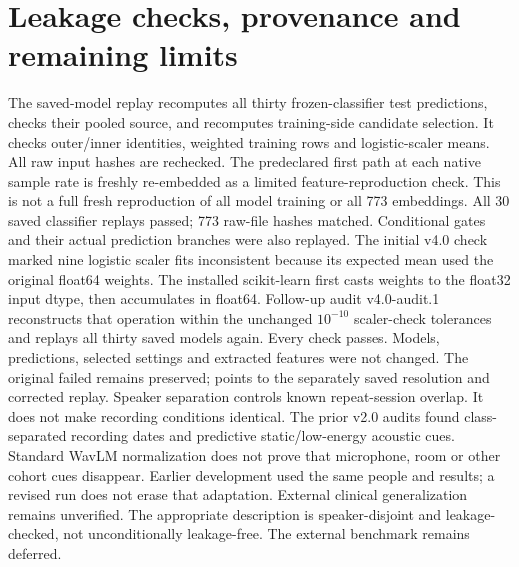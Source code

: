 \documentclass[11pt,a4paper]{article}
\begin{document}
\clearpage\section{Leakage checks, provenance and remaining limits}
The saved-model replay recomputes all thirty frozen-classifier test predictions,
checks their pooled source, and recomputes training-side candidate selection.
It checks outer/inner identities, weighted training rows and logistic-scaler means.
All raw input hashes are rechecked. The predeclared first path at each native
sample rate is freshly re-embedded as a limited feature-reproduction check.
This is not a full fresh reproduction of all model training or all 773 embeddings.
All 30 saved classifier replays passed; 773 raw-file hashes matched. Conditional gates and their actual prediction branches were also replayed.
The initial v4.0 check marked nine logistic scaler fits inconsistent because its
expected mean used the original float64 weights. The installed scikit-learn
first casts weights to the float32 input dtype, then accumulates in float64.
Follow-up audit v4.0-audit.1 reconstructs that operation within the unchanged
$10^{-10}$ scaler-check tolerances and replays all thirty saved models again.
Every check passes. Models, predictions, selected settings and extracted features
were not changed. The original failed  remains preserved;
 points to the separately saved resolution and corrected replay.
Speaker separation controls known repeat-session overlap. It does not make
recording conditions identical. The prior v2.0 audits found class-separated
recording dates and predictive static/low-energy acoustic cues. Standard WavLM
normalization does not prove that microphone, room or other cohort cues disappear.
Earlier development used the same people and results; a revised run does not
erase that adaptation. External clinical generalization remains unverified.
The appropriate description is speaker-disjoint and leakage-checked, not
unconditionally leakage-free. The external benchmark remains deferred.
\end{document}
